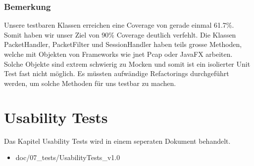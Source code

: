 \documentclass[a4,12pt]{scrartcl}
\begin{document}
\subsubsection{Bemerkung} 
Unsere testbaren Klassen erreichen eine Coverage von gerade einmal 61.7\%. Somit haben wir unser Ziel von 90\% Coverage deutlich verfehlt. Die Klassen PacketHandler, PacketFilter und SessionHandler haben teils grosse Methoden, welche mit Objekten von Frameworks wie jnet Pcap oder JavaFX arbeiten. Solche Objekte sind extrem schwierig zu Mocken und somit ist ein isolierter Unit Test fast nicht möglich. Es müssten aufwändige Refactorings durchgeführt werden, um solche Methoden für uns testbar zu machen.
\newpage

\section{Usability Tests}
Das Kapitel Usability Tests wird in einem seperaten Dokument behandelt. 
\begin{itemize}
\item doc/07\_tests/UsabilityTests\_v1.0
\end{itemize}
\end{document}
